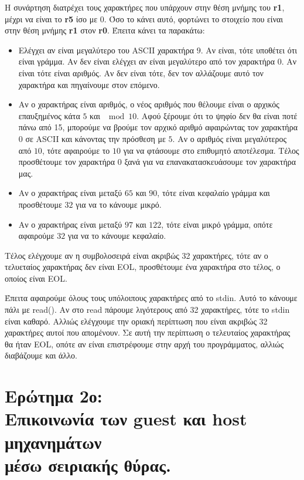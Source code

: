 \documentclass{article}
\newcommand{\english}[1]{\foreignlanguage{english}{{#1}}}
\begin{document}
Η συνάρτηση διατρέχει τους χαρακτήρες που υπάρχουν στην θέση μνήμης του \english{\textbf{r1}}, μέχρι να είναι το \english{\textbf{r5}} ίσο με 0. Όσο το κάνει αυτό, φορτώνει το στοιχείο που είναι στην θέση μνήμης \english{\textbf{r1}} στον \english{\textbf{r0}}. Έπειτα κάνει τα παρακάτω:
\begin{itemize}
    \item Ελέγχει αν είναι μεγαλύτερο του \english{ASCII} χαρακτήρα $9$. Αν είναι, τότε υποθέτει ότι είναι γράμμα. Αν δεν είναι ελέγχει αν είναι μεγαλύτερο από τον χαρακτήρα $0$. Αν είναι τότε είναι αριθμός. Αν δεν είναι τότε, δεν τον αλλάζουμε αυτό τον χαρακτήρα και πηγαίνουμε στον επόμενο.
    \item Αν ο χαρακτήρας είναι αριθμός, ο νέος αριθμός που θέλουμε είναι ο αρχικός επαυξημένος κάτα $5$ και $\mod{10}$. Αφού ξέρουμε ότι το ψηφίο δεν θα είναι ποτέ πάνω από 15, μπορούμε να βρούμε τον αρχικό αριθμό αφαιρώντας τον χαρακτήρα $0$ σε \english{ASCII} και κάνοντας την πρόσθεση με $5$. Αν ο αριθμός είναι μεγαλύτερος από $10$, τότε αφαιρούμε το $10$ για να φτάσουμε στο επιθυμητό αποτέλεσμα. Τέλος προσθέτουμε τον χαρακτήρα $0$ ξανά για να επανακατασκευάσουμε τον χαρακτήρα μας.
    \item Αν ο χαρακτήρας είναι μεταξύ $65$ και $90$, τότε είναι κεφαλαίο γράμμα και προσθέτουμε $32$ για να το κάνουμε μικρό.
    \item Αν ο χαρακτήρας είναι μεταξύ $97$ και $122$, τότε είναι μικρό γράμμα, οπότε αφαιρούμε $32$ για να το κάνουμε κεφαλαίο.
\end{itemize}

Τέλος ελέγχουμε αν η συμβολοσειρά είναι ακριβώς 32 χαρακτήρες, τότε αν ο τελυεταίος χαρακτήρας δεν είναι \english{EOL}, προσθέτουμε ένα χαρακτήρα στο τέλος, ο οποίος είναι \english{EOL}. 

Έπειτα αφαιρούμε όλους τους υπόλοιπους χαρακτήρες από το \english{stdin}. Αυτό το κάνουμε πάλι με \english{read()}. Αν στο \english{read} πάρουμε λιγότερους από 32 χαρακτήρες, τότε το \english{stdin} είναι καθαρό. Αλλιώς ελέγχουμε την οριακή περίπτωση που είναι ακριβώς 32 χαρακτήρες αυτοί που απομένουν. Σε αυτή την περίπτωση ο τελευταίος χαρακτήρας θα ήταν \english{EOL}, οπότε αν είναι επιστρέφουμε στην αρχή του προγράμματος, αλλιώς διαβάζουμε και άλλο. 

\section*{Ερώτημα 2ο: \\ Επικοινωνία των \english{guest} και \english{host} μηχανημάτων \\  μέσω σειριακής θύρας.}
\end{document}
